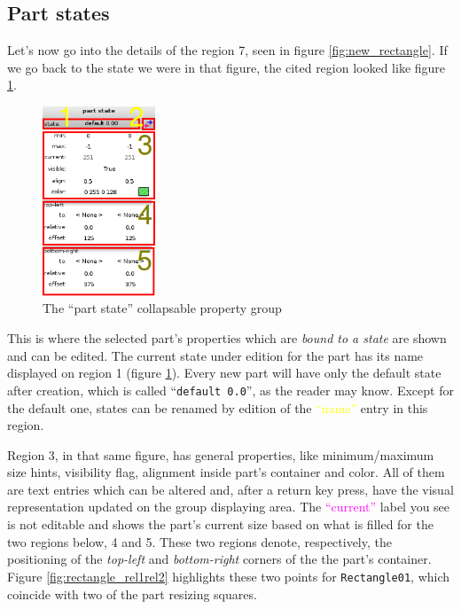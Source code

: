 \documentclass[a4paper]{profusion}
\newcommand{\GUILabel}[1]{\textcolor{magenta}{#1}}
\newcommand{\GUIEditable}[1]{\textcolor{yellow}{#1}} %
\begin{document}
\subsection{Part states}
\label{sec:part_states}

Let's now go into the details of the region 7, seen in figure
\ref{fig:new_rectangle}. If we go back to the state we were in that
figure, the cited region looked like figure
\ref{fig:part_state_group}.

\begin{figure}[h!]
  \centering
  \includegraphics[width=0.3\textwidth]{images/part_state_group.png}
  \caption{The ``part state'' collapsable property group}
  \label{fig:part_state_group}
\end{figure}

This is where the selected part's properties which are \emph{bound to
  a state} are shown and can be edited. The current state under
edition for the part has its name displayed on region 1 (figure
\ref{fig:part_state_group}). Every new part will have only the default
state after creation, which is called ``\texttt{default 0.0}'', as the
reader may know. Except for the default one, states can be renamed by
edition of the \GUIEditable{``name''} entry in this region.

Region 3, in that same figure, has general properties, like
minimum/maximum size hints, visibility flag, alignment inside part's
container and color. All of them are text entries which can be altered
and, after a return key press, have the visual representation updated
on the group displaying area. The \GUILabel{``current''} label you see
is not editable and shows the part's current size based on what is
filled for the two regions below, 4 and 5. These two regions denote,
respectively, the positioning of the \emph{top-left} and
\emph{bottom-right} corners of the the part's container. Figure
\ref{fig:rectangle_rel1rel2} highlights these two points for
\texttt{Rectangle01}, which coincide with two of the part resizing
squares.
\end{document}
